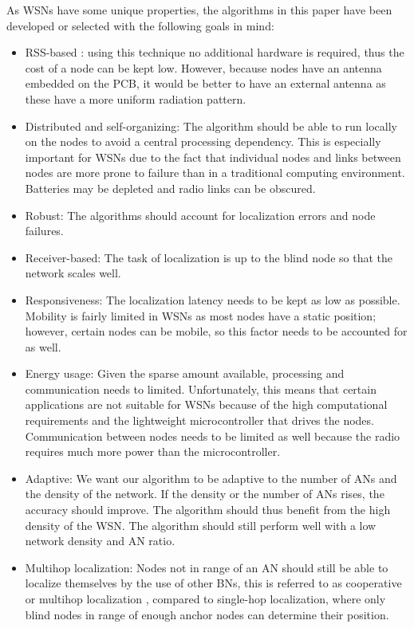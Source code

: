 As WSNs have some unique properties, the algorithms in this paper have been developed or selected with the following goals in mind: 
\begin{itemize}
	\item RSS-based : using this technique no additional hardware is required, thus the cost of a node can be kept low. However, because nodes have an antenna embedded on the PCB, it would be better to have an external antenna as these have a more uniform radiation pattern. 
	\item Distributed and self-organizing: The algorithm should be able to run locally on the nodes to avoid a central processing dependency. This is especially important for WSNs due to the fact that individual nodes and links between nodes are more prone to failure than in a traditional computing environment. Batteries may be depleted and radio links can be obscured.  
	\item Robust: The algorithms should account for localization errors and node failures. 
	\item Receiver-based: The task of localization is up to the blind node so that the network scales well. 
	\item Responsiveness: The localization latency needs to be kept as low as possible. Mobility is fairly limited in WSNs as most nodes have a static position; however, certain nodes can be mobile, so this factor needs to be accounted for as well. 
	\item Energy usage: Given the sparse amount available, processing and communication needs to limited. Unfortunately, this means that certain applications are not suitable for WSNs because of the high computational requirements and the lightweight microcontroller that drives the nodes. Communication between nodes needs to be limited as well because the radio requires much more power than the microcontroller. 
	\item Adaptive: We want our algorithm to be adaptive to the number of ANs and the density of the network. If the density or the number of ANs rises, the accuracy should improve. The algorithm should thus benefit from the high density of the WSN. The algorithm should still perform well with a low network density and AN ratio. 
	\item Multihop localization: Nodes not in range of an AN should still be able to localize themselves by the use of other BNs, this is referred to as cooperative or multihop localization \cite{patwari2005lnc}, compared to single-hop localization, where only blind nodes in range of enough anchor nodes can determine their position. 
\end{itemize}

